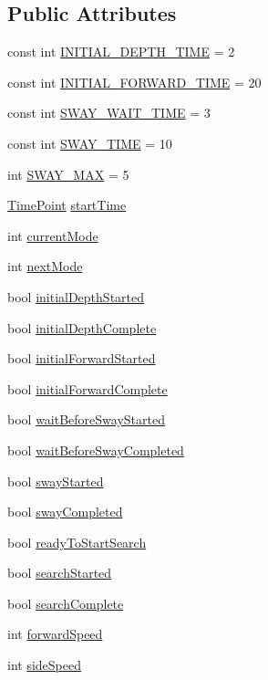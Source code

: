 \subsection*{Public Attributes}
\begin{DoxyCompactItemize}
\item 
const int \hyperlink{classFindGate_aefa2cbabe772d795fc89b719d5b7b07b}{I\+N\+I\+T\+I\+A\+L\+\_\+\+D\+E\+P\+T\+H\+\_\+\+T\+I\+ME} = 2
\item 
const int \hyperlink{classFindGate_a4e5c71e49c224a5c993992af395e8414}{I\+N\+I\+T\+I\+A\+L\+\_\+\+F\+O\+R\+W\+A\+R\+D\+\_\+\+T\+I\+ME} = 20
\item 
const int \hyperlink{classFindGate_aea19ad63039e8990faf996913045df18}{S\+W\+A\+Y\+\_\+\+W\+A\+I\+T\+\_\+\+T\+I\+ME} = 3
\item 
const int \hyperlink{classFindGate_a9bb2ff9887a1360773a9832dd82a504b}{S\+W\+A\+Y\+\_\+\+T\+I\+ME} = 10
\item 
int \hyperlink{classFindGate_a9981995de1e3e38543ffc7453d355811}{S\+W\+A\+Y\+\_\+\+M\+AX} = 5
\item 
\hyperlink{thruster__driver_8cpp_ad3e807c387dc076de974ff7eac67ad81}{Time\+Point} \hyperlink{classFindGate_a0d8cf044b11e48fbb8b818a765403a1b}{start\+Time}
\item 
int \hyperlink{classFindGate_ab1d5b0bf433c8951f34e32601ead4288}{current\+Mode}
\item 
int \hyperlink{classFindGate_ab83928fee09b28f4b2ca1d48055312b4}{next\+Mode}
\item 
bool \hyperlink{classFindGate_a7383fb5fa0105e867b19df0ee00665aa}{initial\+Depth\+Started}
\item 
bool \hyperlink{classFindGate_ab4738da2fe9810aa63d2244a51849e99}{initial\+Depth\+Complete}
\item 
bool \hyperlink{classFindGate_adffee48ee4ac5a6815c56f21698d9487}{initial\+Forward\+Started}
\item 
bool \hyperlink{classFindGate_ad6f1e723ed69d5704b9f610133a67ca8}{initial\+Forward\+Complete}
\item 
bool \hyperlink{classFindGate_ab9f4c3d8f8d3a862561f48e41808a5c6}{wait\+Before\+Sway\+Started}
\item 
bool \hyperlink{classFindGate_aff3c61e521e111ac987278ef7383cb5f}{wait\+Before\+Sway\+Completed}
\item 
bool \hyperlink{classFindGate_a6b7960689fa102c97a9c18425871de04}{sway\+Started}
\item 
bool \hyperlink{classFindGate_a0aa651dcfa539ce3bd16613e1673b9d8}{sway\+Completed}
\item 
bool \hyperlink{classFindGate_a1cfd9eed2de5d70c4e5ef9adb83f49af}{ready\+To\+Start\+Search}
\item 
bool \hyperlink{classFindGate_ade3103932cb97bd39051af6173964fe8}{search\+Started}
\item 
bool \hyperlink{classFindGate_ade660eb6ac2d3dceb601c56cd3483a0d}{search\+Complete}
\item 
int \hyperlink{classFindGate_a0cd54dd6dca1a20954cfca669dd057d0}{forward\+Speed}
\item 
int \hyperlink{classFindGate_ab49c41270d25e7199254678b2045885a}{side\+Speed}
\end{DoxyCompactItemize}


